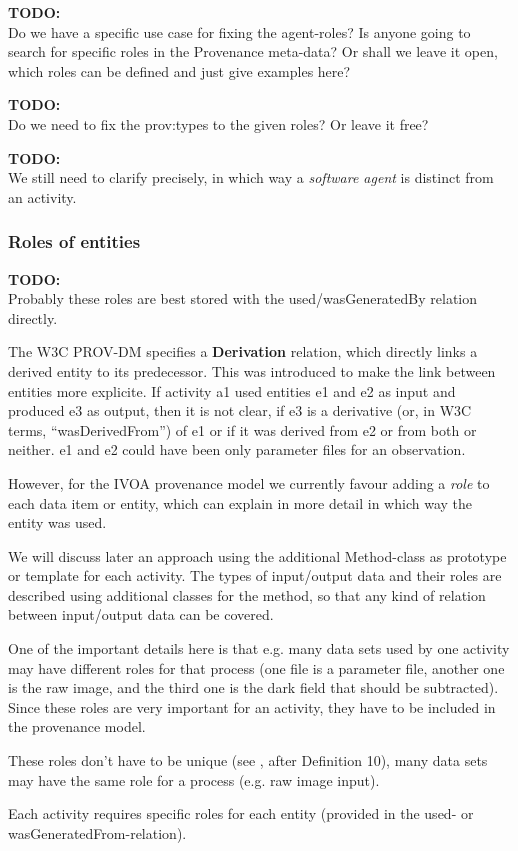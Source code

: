 \documentclass[11pt,a4paper]{ivoa}
\newcommand{\TODO}[1]{%
    \noindent%
    \colorbox{todocolor}{%
            \parbox{0.85\linewidth}{\sffamily \textbf{TODO:}\\
            #1}
    }%
    \vspace{2pt}

}
\begin{document}
\TODO{Do we have a specific use case for fixing the agent-roles? Is anyone going to search for specific roles in the Provenance meta-data?
Or shall we leave it open, which roles can be defined and just give examples here?}

\TODO{Do we need to fix the prov:types to the given roles? Or leave it free?}

\TODO{We still need to clarify precisely, in which way a \emph{software agent} is distinct from an activity.}


\subsubsection{Roles of entities}
\TODO{Probably these roles are best stored with the used/wasGeneratedBy relation directly.}
The W3C PROV-DM specifies a \textbf{Derivation} relation, which directly links a derived entity to its predecessor. This was introduced to make the link between entities more explicite. If activity a1 used entities e1 and e2 as input and produced e3 as output, then it is not clear, if e3 is a derivative (or, in W3C terms, ``wasDerivedFrom'') of e1 or if it was derived from e2 or from both or neither. e1 and e2 could have been only parameter files for an observation.  

However, for the IVOA provenance model we currently favour adding a \emph{role} to each data item or entity, which can explain in more detail in which way the entity was used.

We will discuss later an approach using the additional Method-class as prototype or template for each activity.
The types of input/output data and their roles are described using additional classes for the method, so that any kind of relation between input/output data can be covered.

One of the important details here is that e.g. many data sets used by one activity may have different roles for that process (one file is a parameter file, another one is the raw image, and the third one is the dark field that should be subtracted). Since these roles are very important for an activity, they have to be included in the provenance model.

These roles don't have to be unique (see \cite{moreau2010}, after Definition 10), many data sets may have the same role for a process (e.g. raw image input).

Each activity requires specific roles for each entity (provided in the used- or wasGeneratedFrom-relation). 
\end{document}
